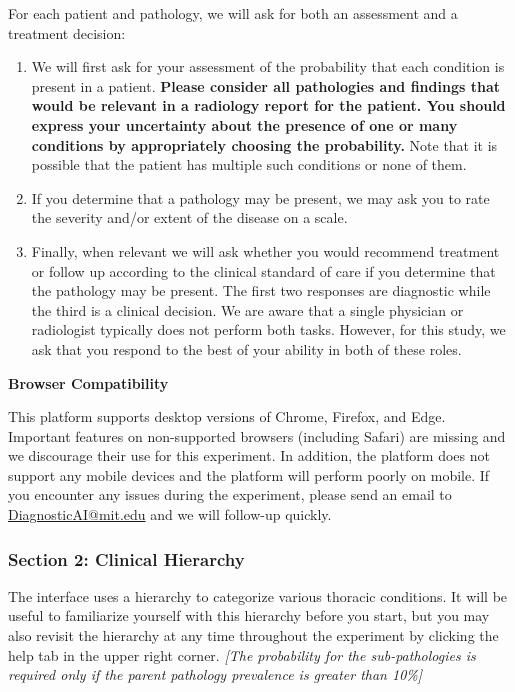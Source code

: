 For each patient and pathology, we will ask for both an assessment
and a treatment decision:
\begin{enumerate}
\item We will first ask for your assessment of the probability that each
condition is present in a patient. \textbf{Please consider all pathologies
and findings that would be relevant in a radiology report for the
patient. You should express your uncertainty about the presence of
one or many conditions by appropriately choosing the probability.}
Note that it is possible that the patient has multiple such conditions
or none of them.
\item If you determine that a pathology may be present, we may ask you to
rate the severity and/or extent of the disease on a scale.
\item Finally, when relevant we will ask whether you would recommend treatment
or follow up according to the clinical standard of care if you determine
that the pathology may be present. The first two responses are diagnostic
while the third is a clinical decision. We are aware that a single
physician or radiologist typically does not perform both tasks. However,
for this study, we ask that you respond to the best of your ability
in both of these roles.
\end{enumerate}
\textbf{Browser Compatibility}

This platform supports desktop versions of Chrome, Firefox, and Edge.
Important features on non-supported browsers (including Safari) are
missing and we discourage their use for this experiment. In addition,
the platform does not support any mobile devices and the platform
will perform poorly on mobile. If you encounter any issues during
the experiment, please send an email to \href{mailto:DiagnosticAI@mit.edu}{DiagnosticAI@mit.edu}
and we will follow-up quickly.

\subsubsection*{Section 2: Clinical Hierarchy}

The interface uses a hierarchy to categorize various thoracic conditions.
It will be useful to familiarize yourself with this hierarchy before
you start, but you may also revisit the hierarchy at any time throughout
the experiment by clicking the help tab in the upper right corner.\textit{
{[}The probability for the sub-pathologies is required only if the
parent pathology prevalence is greater than 10\%{]}}

